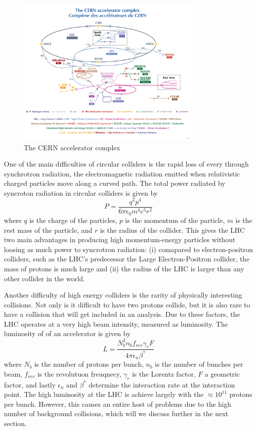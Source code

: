\begin{figure}[htbp]
    \centering
    \includegraphics[width=0.8\textwidth]{figures/chapter3/CERN-accelerator-complex.png}
    \caption{The CERN accelerator complex \cite{ref:Lopienska}}
    \label{fig:cern-accelerator-complex}
\end{figure}


One of the main difficulties of circular colliders is the rapid loss of every through synchrotron radiation, the electromagnetic radiation emitted when relativistic charged particles move along a curved path. The total power radiated by syncroton radiation in circular colliders is given by
\begin{equation}
    P = \frac{q^2p^4}{6 \pi \epsilon_0 m^4 c^5 r^2}
\end{equation}
where $q$ is the charge of the particles, $p$ is the momentum of the particle, $m$ is the rest mass of the particle, and $r$ is the radius of the collider. This gives the LHC two main advantages in producing high momentum-energy particles without loosing as much power to syncrotron radiation: (i) comapared to electron-positron colliders, such as the LHC's predecessor the Large Electron-Positron collider, the mass of protons is much large and (ii) the radius of the LHC is larger than any other collider in the world. 

Another difficulty of high energy colliders is the rarity of physically interesting collisions. Not only is it difficult to have two protons collide, but it is also rare to have a collision that will get included in an analysis. Due to these factors, the LHC operates at a very high beam intensity, measured as luminosity. The luminosity of of an accelerator is given by
\begin{equation}
    L = \frac{N_b^2n_b f_{rev} \gamma_r F}{4 \pi \epsilon_n \beta^*}
\end{equation}
where $N_b$ is the number of protons per bunch, $n_b$ is the number of bunches per beam, $f_{rev}$ is the revolutuon freuqnecy, $\gamma_r$ is the Lorentz factor, $F$ a geometric factor, and lastly $\epsilon_n$ and $\beta^*$ determine the interaction rate at the interaction point. The high luminosity at the LHC is achieve largely with the $\approx 10^{11}$ protons per bunch. However, this causes an entire host of problems due to the high number of background collisions, which will we discuss further in the next section. 

